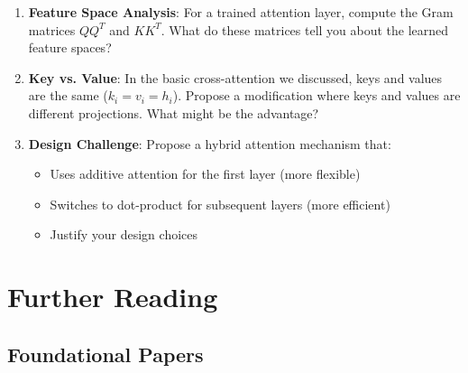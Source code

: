 \documentclass{article}
\begin{document}
\begin{enumerate}
    
    \item \textbf{Feature Space Analysis}: For a trained attention layer, compute the Gram matrices $Q Q^T$ and $K K^T$. What do these matrices tell you about the learned feature spaces?
    
    \item \textbf{Key vs. Value}: In the basic cross-attention we discussed, keys and values are the same ($k_i = v_i = h_i$). Propose a modification where keys and values are different projections. What might be the advantage?
    
    \item \textbf{Design Challenge}: Propose a hybrid attention mechanism that:
    \begin{itemize}
        \item Uses additive attention for the first layer (more flexible)
        \item Switches to dot-product for subsequent layers (more efficient)
        \item Justify your design choices
    \end{itemize}
\end{enumerate}

\section{Further Reading}

\subsection{Foundational Papers}
\end{document}
